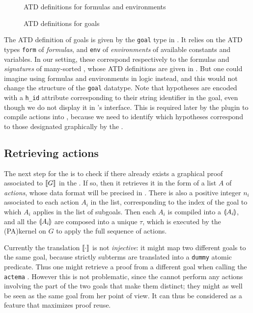 \begin{figure}
  
  \caption{ATD definitions for  formulas and environments}
\end{figure}

\begin{figure}
  
  \caption{ATD definitions for goals}
\end{figure}

The ATD definition of goals is given by the \texttt{goal} type in
. It relies on
the ATD types \texttt{form} of \emph{formulas}, and \texttt{env} of
\emph{environments} of available constants and variables. In our setting, these
correspond respectively to the formulas and \emph{signatures} of many-sorted
, whose ATD definitions are given in . But one
could imagine using formulas and environments in  logic instead, and
this would not change the structure of the \texttt{goal} datatype. Note that
hypotheses are encoded with a \texttt{h\_id} attribute corresponding to their
string identifier in the  goal, even though we do not display it in 's
interface. This is required later by the plugin to compile actions into ,
because we need to identify which  hypotheses correspond to those designated
graphically by the .

\subsection{Retrieving actions}

The next step for the  is to check if there already exists a
graphical proof associated to $\llbracket G \rrbracket$ in the . If so,
then it retrieves it in the form of a list $A$ of \emph{actions}, whose data
format will be precised in . There is also a positive
integer $n_i$ associated to each action $A_i$ in the list, corresponding to the
index of the goal to which $A_i$ applies in the list of subgoals. Then each
$A_i$ is compiled into a  $\llparenthesis A_i \rrparenthesis$, and all the $\llparenthesis A_i \rrparenthesis$
are composed into a unique  $\tau$, which is executed by the
\kl(PA){kernel} on $G$ to apply the full sequence of actions.

\begin{remark}
  Currently the translation $\llbracket \cdot \rrbracket$ is not \emph{injective}: it might
  map two different  goals to the same  goal, because strictly
   subterms are translated into a \texttt{dummy} atomic predicate.
  Thus one might retrieve a proof from a different goal when calling the
  \texttt{actema} . However this is not problematic, since the
   cannot perform any actions involving the part of the two goals
  that make them distinct; they might as well be seen as the same goal from her
  point of view. It can thus be considered as a feature that maximizes proof
  reuse.
\end{remark}

